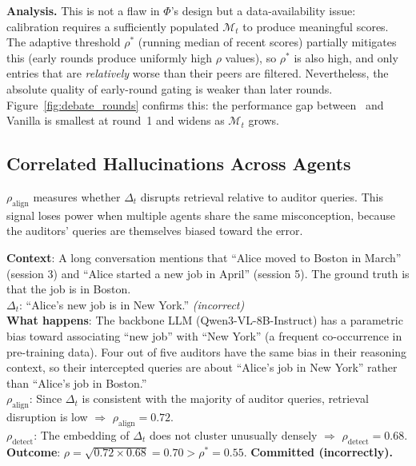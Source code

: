 \noindent
\textbf{Analysis.}
This is not a flaw in $\Phi$'s design but a
data-availability issue: calibration requires a
sufficiently populated $\mathcal{M}_t$ to produce
meaningful scores.  The adaptive threshold $\rho^*$
(running median of recent scores) partially mitigates
this (early rounds produce uniformly high $\rho$
values), so $\rho^*$ is also high, and only entries
that are \emph{relatively} worse than their peers
are filtered.  Nevertheless, the absolute quality of
early-round gating is weaker than later rounds.
Figure~\ref{fig:debate_rounds} confirms this: the
performance gap between \system\ and Vanilla is
smallest at round~1 and widens as $\mathcal{M}_t$
grows.

\subsection{Correlated Hallucinations Across Agents}
\label{app:failure_correlated}

$\rho_{\text{align}}$ measures whether $\Delta_t$
disrupts retrieval relative to auditor queries.
This signal loses power when multiple agents share
the same misconception, because the auditors'
queries are themselves biased toward the error.

\begin{tcolorbox}[colback=gray!5, colframe=gray!60,
  title={\small Example: LoCoMo, G-Memory, Round 4},
  fonttitle=\bfseries\small, boxrule=0.4pt,
  arc=1.5mm]
\small
\textbf{Context}: A long conversation mentions that
``Alice moved to Boston in March'' (session 3) and
``Alice started a new job in April'' (session 5).
The ground truth is that the job is in Boston.\\[3pt]
\textbf{$\Delta_t$}: ``Alice's new job is in
New York.'' \hfill\textit{(incorrect)}\\[3pt]
\textbf{What happens}: The backbone LLM
(Qwen3-VL-8B-Instruct) has a parametric bias toward
associating ``new job'' with ``New York'' (a frequent
co-occurrence in pre-training data).  Four out of
five auditors have the same bias in their reasoning
context, so their intercepted queries are about
``Alice's job in New York'' rather than ``Alice's
job in Boston.''\\[3pt]
\textbf{$\rho_{\text{align}}$}: Since $\Delta_t$
is consistent with the majority of auditor queries,
retrieval disruption is low $\Rightarrow$
$\rho_{\text{align}} = 0.72$.\\[3pt]
\textbf{$\rho_{\text{detect}}$}: The embedding of
$\Delta_t$ does not cluster unusually densely
$\Rightarrow$ $\rho_{\text{detect}} = 0.68$.\\[3pt]
\textbf{Outcome}: $\rho = \sqrt{0.72 \times 0.68}
= 0.70 > \rho^* = 0.55$.  \textbf{Committed
(incorrectly).}
\end{tcolorbox}

